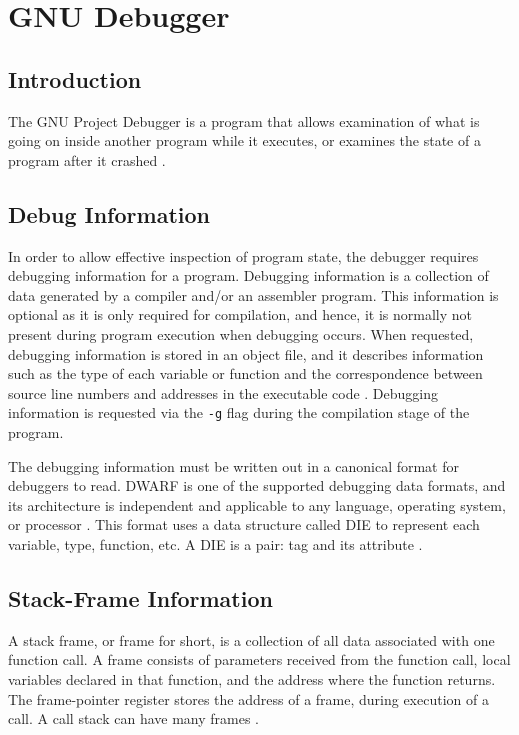 \chapter{GNU Debugger} \label{GDB}

\section{Introduction}
The GNU Project Debugger is a program that allows examination of what is going on
inside another program while it executes, or examines the state of a program
after it crashed \cite{Reference3}.

\section{Debug Information}
In order to allow effective inspection of program state, the
debugger requires debugging information for a program. Debugging
information is a collection of data generated by a compiler and/or an assembler
program. This information is optional as it is only required for compilation,
and hence, it is normally not present during program execution when debugging
occurs. When requested, debugging information is stored in an object file, and it describes
information such as the type of each variable or function and
the correspondence between source line numbers and addresses in the executable
code \cite{Reference6}. Debugging information is requested via the \verb|-g|
flag during the compilation stage of the
program.

The debugging information must be written out in a canonical format for
debuggers to read. DWARF is one of the supported debugging data formats, and its architecture is
independent and applicable to any language, operating system, or processor \cite{Reference7}. This format uses a data structure called DIE to represent
each variable, type, function, etc. A DIE is a pair: tag
and its attribute \cite{Reference8}.

\section{Stack-Frame Information}
A stack frame, or frame for short, is a collection of all data associated with
one function call. A frame consists of parameters received from the function call, local variables declared in that
function, and the address where the
function returns. The frame-pointer register stores the address of a frame,
during execution of a call. A call stack can have many frames \cite{Reference12}.

